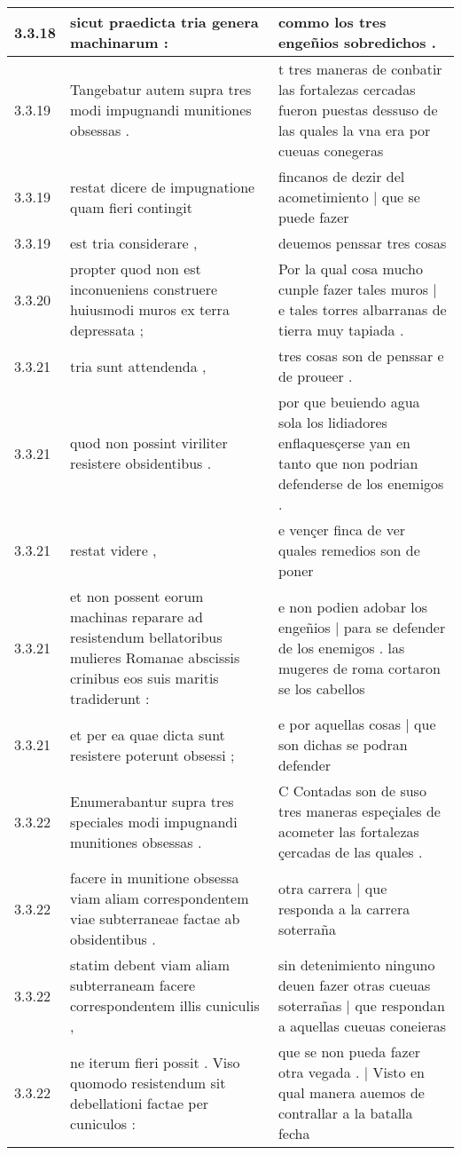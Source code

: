 \begin{tabular}{|p{1cm}|p{6.5cm}|p{6.5cm}|}
3.3.18 & sicut praedicta tria genera machinarum : & commo los tres engeñios sobredichos . \\\hline
3.3.19 & Tangebatur autem supra tres modi impugnandi munitiones obsessas . & t tres maneras de conbatir las fortalezas cercadas fueron puestas dessuso de las quales la vna era por cueuas conegeras \\\hline
3.3.19 & restat dicere de impugnatione quam fieri contingit & fincanos de dezir del acometimiento | que se puede fazer \\\hline
3.3.19 & est tria considerare , & deuemos penssar tres cosas \\\hline
3.3.20 & propter quod non est inconueniens construere huiusmodi muros ex terra depressata ; & Por la qual cosa mucho cunple fazer tales muros | e tales torres albarranas de tierra muy tapiada . \\\hline
3.3.21 & tria sunt attendenda , & tres cosas son de penssar e de proueer . \\\hline
3.3.21 & quod non possint viriliter resistere obsidentibus . & por que beuiendo agua sola los lidiadores enflaquesçerse yan en tanto que non podrian defenderse de los enemigos . \\\hline
3.3.21 & restat videre , & e vençer finca de ver quales remedios son de poner \\\hline
3.3.21 & et non possent eorum machinas reparare ad resistendum bellatoribus mulieres Romanae abscissis crinibus eos suis maritis tradiderunt : & e non podien adobar los engeñios | para se defender de los enemigos . las mugeres de roma cortaron se los cabellos \\\hline
3.3.21 & et per ea quae dicta sunt resistere poterunt obsessi ; & e por aquellas cosas | que son dichas se podran defender \\\hline
3.3.22 & Enumerabantur supra tres speciales modi impugnandi munitiones obsessas . & C Contadas son de suso tres maneras espeçiales de acometer las fortalezas çercadas de las quales . \\\hline
3.3.22 & facere in munitione obsessa viam aliam correspondentem viae subterraneae factae ab obsidentibus . & otra carrera | que responda a la carrera soterraña \\\hline
3.3.22 & statim debent viam aliam subterraneam facere correspondentem illis cuniculis , & sin detenimiento ninguno deuen fazer otras cueuas soterrañas | que respondan a aquellas cueuas coneieras \\\hline
3.3.22 & ne iterum fieri possit . Viso quomodo resistendum sit debellationi factae per cuniculos : & que se non pueda fazer otra vegada . | Visto en qual manera auemos de contrallar a la batalla fecha \\\hline

\end{tabular}
